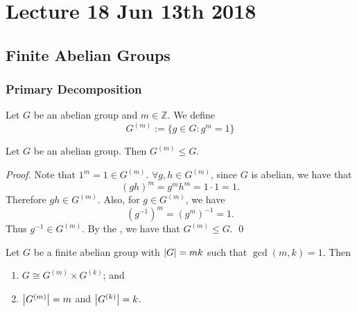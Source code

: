 \chapter{Lecture 18 Jun 13th 2018}%
\label{chp:lecture_18_jun_13th_2018}

\section{Finite Abelian Groups}%
\label{sec:finite_abelian_groups}

\subsection{Primary Decomposition}%
\label{sub:primary_decomposition}

\begin{note}[Notation]
  Let $G$ be an abelian group and $m \in \mathbb{Z}.$ We define
  \begin{equation*}
    G^{(m)} := \{g \in G : g^m = 1\}
  \end{equation*}
\end{note}

\begin{propo}
\label{propo:group_of_elements_of_the_same_order_is_a_subgroup}
  Let $G$ be an abelian group. Then $G^{(m)} \leq G$.
\end{propo}

\begin{proof}
  Note that $1^m = 1 \in G^{(m)}$. $\forall g, h \in G^{(m)}$, since $G$ is abelian, we have that
  \begin{equation*}
    \left( gh \right)^m = g^m h^m = 1 \cdot 1 = 1.
  \end{equation*}
  Therefore $gh \in G^{(m)}$. Also, for $g \in G^{(m)}$, we have 
  \begin{equation*}
    \left( g^{-1} \right)^m = \left( g^m \right)^{-1} = 1.
  \end{equation*}
  Thus $g^{-1} \in G^{(m)}$. By the , we have that $G^{(m)} \leq G$. \qed
\end{proof}

\begin{propo}
\label{propo:decomposition_of_a_finite_abelian_group}
  Let $G$ be a finite abelian group with $\left|G\right| = mk$ such that $\gcd(m, k) = 1$. Then
  \begin{enumerate}
    \item $G \cong G^{(m)} \times G^{(k)}$; and
    \item $\left|G^{(m)}\right| = m$ and $\left|G^{(k)}\right| = k$.
  \end{enumerate}
\end{propo}


